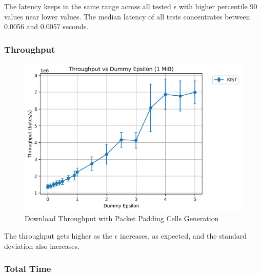 The latency keeps in the same range across all tested $\epsilon$ with higher percentile 90 values near lower values. The median latency of all tests concentrates between 0.0056 and 0.0057 seconds.

\subsubsection{Throughput}\label{sec:performance_evaluation_throughput_tls_packets}

\begin{figure}[htbp]
    \centering
    \includegraphics[scale=0.4]{Chapters/Figures/Plots/Dummy/throughput_dummy_1_mib.png}
    \caption{Download Throughput with Packet Padding Cells Generation}\label{fig:dummy_throughput_tls_packets}
\end{figure}

The throughput gets higher as the $\epsilon$ increases, as expected, and the standard deviation also increases.

\subsubsection{Total Time}

